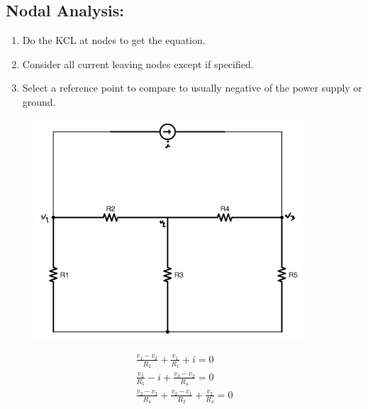 \documentclass[a4paper,12]{article}
\begin{document}
\subsection{Nodal Analysis:}
\begin{enumerate}
	\item Do the KCL at nodes to get the equation.
	\item Consider all current leaving nodes except if specified.
	\item Select a reference point to compare to usually negative of the power supply or ground.
\end{enumerate}
\begin{figure}[H]
    \centering
    \includegraphics[width=100mm]{Image/5.jpg}
\end{figure}
\begin{gather}
    \frac{v_1-v_2}{R_2}+\frac{v_1}{R_1}+i =0\\
    \frac{v_3}{R_5}-i+\frac{v_3-v_2}{R_4} =0\\
    \frac{v_2-v_3}{R_4}+\frac{v_2-v_1}{R_2}+\frac{v_2}{R_4} =0
\end{gather}
\end{document}
